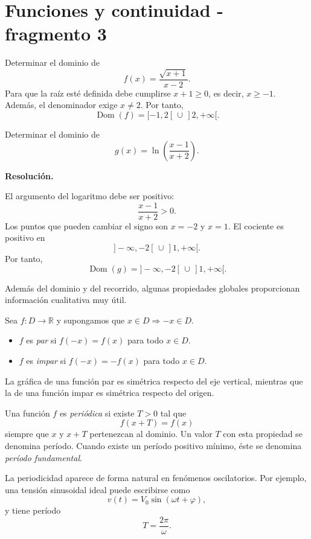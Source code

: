 \section{Funciones y continuidad - fragmento 3}
\begin{example}
Determinar el dominio de
\[
f(x)=\frac{\sqrt{x+1}}{x-2}.
\]
Para que la raíz esté definida debe cumplirse $x+1\geq0$, es decir, $x\geq-1$. Además, el denominador exige $x\neq2$. Por tanto,
\[
\operatorname{Dom}(f)=[-1,2[\,\cup\,]2,+\infty[.
\]
\end{example}

\begin{solvedexercise}
Determinar el dominio de
\[
g(x)=\ln\!\left(\frac{x-1}{x+2}\right).
\]

\textbf{Resolución.}\par\smallskip
El argumento del logaritmo debe ser positivo:
\[
\frac{x-1}{x+2}>0.
\]
Los puntos que pueden cambiar el signo son $x=-2$ y $x=1$. El cociente es positivo en
\[
]-\infty,-2[\,\cup\,]1,+\infty[.
\]
Por tanto,
\[
\operatorname{Dom}(g)=]-\infty,-2[\,\cup\,]1,+\infty[.
\]
\end{solvedexercise}

Además del dominio y del recorrido, algunas propiedades globales proporcionan información cualitativa muy útil.

\begin{definition}[Paridad]
Sea $f:D\to\mathbb{R}$ y supongamos que $x\in D\Rightarrow -x\in D$.
\begin{itemize}
\item $f$ es \emph{par} si $f(-x)=f(x)$ para todo $x\in D$.
\item $f$ es \emph{impar} si $f(-x)=-f(x)$ para todo $x\in D$.
\end{itemize}
\end{definition}

La gráfica de una función par es simétrica respecto del eje vertical, mientras que la de una función impar es simétrica respecto del origen.

\begin{definition}[Periodicidad]
Una función $f$ es \emph{periódica} si existe $T>0$ tal que
\[
f(x+T)=f(x)
\]
siempre que $x$ y $x+T$ pertenezcan al dominio. Un valor $T$ con esta propiedad se denomina período. Cuando existe un período positivo mínimo, éste se denomina \emph{período fundamental}.
\end{definition}

La periodicidad aparece de forma natural en fenómenos oscilatorios. Por ejemplo, una tensión sinusoidal ideal puede escribirse como
\[
v(t)=V_0\sin(\omega t+\varphi),
\]
y tiene período
\[
T=\frac{2\pi}{\omega}.
\]

